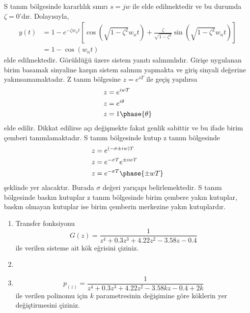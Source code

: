 S tanım bölgesinde kararlılık sınırı $s=jw$ ile elde edilmektedir ve bu durumda $\zeta=0$'dır. Dolayısıyla,
\begin{equation}
\begin{split}
    y(t)&=1-e^{-\zeta w_nt}\left[\cos(\sqrt{1-\zeta^2}w_nt)+\frac{\zeta}{\sqrt{1-\zeta^2}}\sin(\sqrt{1-\zeta^2}w_nt)\right]\\
    &=1-\cos(w_nt)
\end{split}
\end{equation}
elde edilmektedir. Görüldüğü üzere sistem yanıtı salınımlıdır. Girişe uygulanan birim basamak sinyaline karşın sistem salınım yapmakta ve giriş sinyali değerine yakınsamamaktadır. Z tanım bölgesine $z=e^{sT}$ ile geçiş yapılırsa
\begin{equation}
    \begin{split}
        z&=e^{iwT}\\
        z&=e^{i\theta}\\
        z&=1\phase{ \theta}
    \end{split}
\end{equation}
elde edilir. Dikkat edilirse açı değişmekte fakat genlik sabittir ve bu ifade birim çemberi tanımlamaktadır. S tanım bölgesinde kutup z tanım bölgesinde 
\begin{equation}
    \begin{split}
        z&=e^{(-\sigma\pm iw) T}\\
        z&=e^{-\sigma T}e^{\pm iwT}\\
        z&=e^{-\sigma T}\phase{\pm wT}
    \end{split}
\end{equation}
şeklinde yer alacaktır. Burada $\sigma$ değeri yarıçapı belirlemektedir. S tanım bölgesinde baskın kutuplar z tanım bölgesinde birim çembere yakın kutuplar, baskın olmayan kutuplar ise birim çemberin merkezine yakın kutuplardır.

\begin{enumerate}
    \item Transfer fonksiyonu
    \begin{equation}
        G(z)=\frac{1}{z^4+0.3z^3+4.22z^2-3.58z-0.4}
    \end{equation}
    ile verilen sisteme ait kök eğrisini çiziniz.
    
    \item 
    \item 
    \begin{equation}
        p_(z)=\frac{1}{z^4+0.3z^3+4.22z^2-3.58kz-0.4+2k}
    \end{equation}
    ile verilen polinomu için $k$ parametresinin değişimine göre köklerin yer değiştirmesini çiziniz.
\end{enumerate}